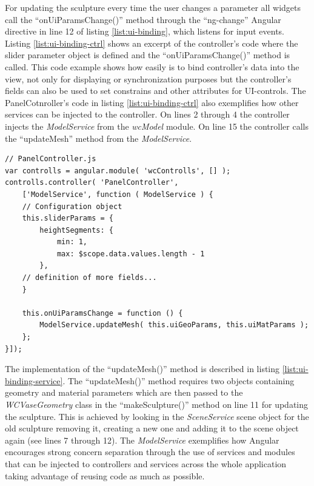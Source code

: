 \documentclass[../medieninformatik-arbeit.tex]{subfiles}
\begin{document}
For updating the sculpture every time the user changes a parameter all widgets call the ``onUiParamsChange()'' method through the ``ng-change'' Angular directive in line 12 of listing \ref{list:ui-binding}, which listens for input events. Listing \ref{list:ui-binding-ctrl} shows an excerpt of the controller's code where the slider parameter object is defined and the ``onUiParamsChange()'' method is called. This code example shows how easily is to bind controller's data into the view, not only for displaying or synchronization purposes but the controller's fields can also be used to set constrains and other attributes for UI-controls. The PanelCotnroller's code in listing \ref{list:ui-binding-ctrl} also exemplifies how other services can be injected to the controller. On lines 2 through 4 the controller injects the \textit{ModelService} from the \textit{wcModel} module. On line 15 the controller calls the ``updateMesh'' method from the \textit{ModelService}. 

\begin{lstlisting}[style=htmlcssjs, caption={Binded controller data and the called controller function from the view},label=list:ui-binding-ctrl]
// PanelController.js
var controlls = angular.module( 'wcControlls', [] );
controlls.controller( 'PanelController', 
	['ModelService', function ( ModelService ) {
	// Configuration object 
	this.sliderParams = {
	    heightSegments: {
	    	min: 1,
	        max: $scope.data.values.length - 1
	    },    
	// definition of more fields...        	
	}
    
	this.onUiParamsChange = function () {
		ModelService.updateMesh( this.uiGeoParams, this.uiMatParams );
	};
}]);	
\end{lstlisting}

The implementation of the ``updateMesh()'' method is described in listing \ref{list:ui-binding-service}. The ``updateMesh()'' method requires two objects containing geometry and material parameters which are then passed to the \textit{WCVaseGeometry} class in the ``makeSculpture()'' method on line 11 for updating the sculpture. This is achieved by looking in the \textit{SceneService} scene object for the old sculpture removing it, creating a new one and adding it to the scene object again (see lines 7 through 12). The \textit{ModelService} exemplifies how Angular encourages strong concern separation through the use of services and modules that can be injected to controllers and services across the whole application taking advantage of reusing code as much as possible. 
\end{document}
